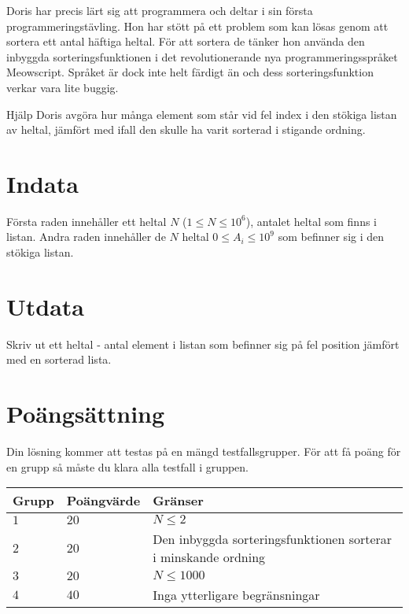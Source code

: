 \noindent
Doris har precis lärt sig att programmera och deltar i sin första programmeringstävling.
Hon har stött på ett problem som kan lösas genom att sortera ett antal häftiga heltal.
För att sortera de tänker hon använda den inbyggda sorteringsfunktionen i det revolutionerande nya programmeringsspråket Meowscript.
Språket är dock inte helt färdigt än och dess sorteringsfunktion verkar vara lite buggig.

\noindent
Hjälp Doris avgöra hur många element som står vid fel index i den stökiga listan av heltal, jämfört med ifall den skulle ha varit sorterad i stigande ordning.
\section*{Indata}
\noindent
Första raden innehåller ett heltal $N$ ($1\leq N \leq 10^6$), antalet heltal som finns i listan.
\noindent
Andra raden innehåller de $N$ heltal $0\leq A_i \leq 10^9$ som befinner sig i den stökiga listan.

\section*{Utdata}
\noindent
Skriv ut ett heltal - antal element i listan som befinner sig på fel position jämfört med en sorterad lista.
\section*{Poängsättning}
\noindent
Din lösning kommer att testas på en mängd testfallsgrupper.
\noindent
För att få poäng för en grupp så måste du klara alla testfall i gruppen.

\noindent
\begin{tabular}{| l | l | l |}
\hline
  Grupp & Poängvärde & Gränser \\ \hline
  $1$    & $20$       &  $N \leq 2$  \\ \hline 
  $2$    & $20$       &  Den inbyggda sorteringsfunktionen sorterar i minskande ordning \\ \hline 
  $3$    & $20$       &  $N \leq 1000$ \\ \hline
  $4$    & $40$       &  Inga ytterligare begränsningar \\ \hline
\end{tabular}
